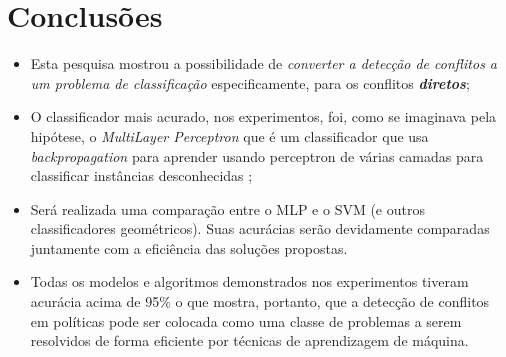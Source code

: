 \chapter{Conclusões}\label{conclusoes}
\begin{itemize}
	\item Esta pesquisa mostrou a possibilidade de \textit{converter a detecção de conflitos a um problema de classificação} especificamente, para os conflitos \textbf{\textit{diretos}};
	\item O classificador mais acurado, nos experimentos, foi, como se imaginava pela hipótese, o \textit{MultiLayer Perceptron} que é um classificador que usa \textit{backpropagation} para aprender usando perceptron de várias camadas para classificar instâncias desconhecidas \cite{eibe2016};
	\item Será realizada uma comparação entre o MLP e o SVM (e outros classificadores geométricos). Suas acurácias serão devidamente comparadas juntamente com a eficiência das soluções propostas.
	\item Todas os modelos e algoritmos demonstrados nos experimentos tiveram acurácia acima de 95\% o que mostra, portanto, que a detecção de conflitos em políticas pode ser colocada como uma classe de problemas a serem resolvidos de forma eficiente por técnicas de aprendizagem de máquina.
\end{itemize}